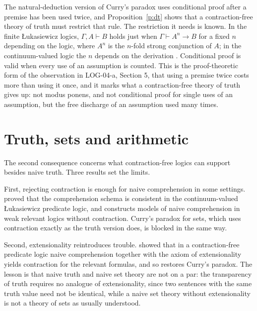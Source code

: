 \documentclass{situationist-preprint}
\begin{document}
The natural-deduction version of Curry's paradox uses conditional proof after a premise has been used twice, and Proposition~\ref{p:dt} shows that a contraction-free theory of truth must restrict that rule. The restriction it needs is known. In the finite Łukasiewicz logics, $\Gamma, A \vdash B$ holds just when $\Gamma \vdash A^{n} \to B$ for a fixed $n$ depending on the logic, where $A^n$ is the $n$-fold strong conjunction of $A$; in the continuum-valued logic the $n$ depends on the derivation \citep{Hajek1998}. Conditional proof is valid when every use of an assumption is counted. This is the proof-theoretic form of the observation in LOG-04-a, Section 5, that using a premise twice costs more than using it once, and it marks what a contraction-free theory of truth gives up: not modus ponens, and not conditional proof for single uses of an assumption, but the free discharge of an assumption used many times.

\section{Truth, sets and arithmetic}

The second consequence concerns what contraction-free logics can support besides naive truth. Three results set the limits.

First, rejecting contraction is enough for naive comprehension in some settings. \citet{White1979} proved that the comprehension schema is consistent in the continuum-valued Łukasiewicz predicate logic, and \citet{Brady2006} constructs models of naive comprehension in weak relevant logics without contraction. Curry's paradox for sets, which uses contraction exactly as the truth version does, is blocked in the same way.

Second, extensionality reintroduces trouble. \citet{Grisin1982} showed that in a contraction-free predicate logic naive comprehension together with the axiom of extensionality yields contraction for the relevant formulas, and so restores Curry's paradox. The lesson is that naive truth and naive set theory are not on a par: the transparency of truth requires no analogue of extensionality, since two sentences with the same truth value need not be identical, while a naive set theory without extensionality is not a theory of sets as usually understood.
\end{document}
